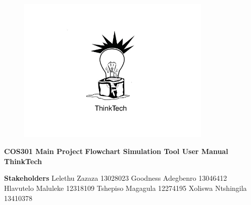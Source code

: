 \begin{titlepage}
	\begin{center}
		
		\begin{figure}[t]
			\centering
			\includegraphics[width=350px, height=7cm]{images/thinkTechLogo.jpg}
		\end{figure}	
	
	\begin{flushright} 
		
		\textbf{\LARGE COS301 Main Project}
		\newline \newline \newline
		\textbf{\LARGE Flowchart Simulation Tool User Manual}
		\newline \newline \newline
 		\textbf{\LARGE ThinkTech}
		\newline \newline
	\end{flushright}
	
	\begin{flushright} \large
			
			\textbf{\LARGE Stakeholders}\newline 
			Lelethu Zazaza 13028023\newline
			Goodness Adegbenro 13046412\newline
			Hlavutelo Maluleke 12318109\newline
			Tshepiso Magagula 12274195\newline
			Xoliswa Ntshingila 13410378\newline
			
			
	\end{flushright}
	
	\begin{flushright} \large
	

\end{flushright}
\end{center}
\end{titlepage}

